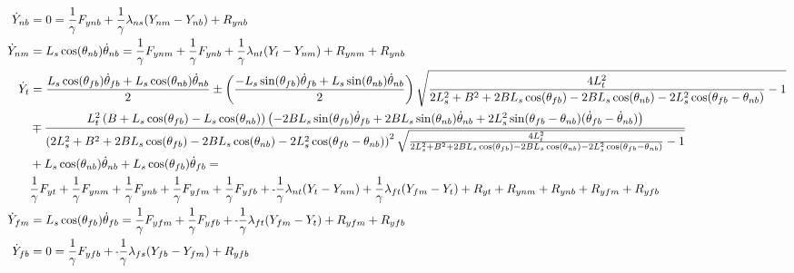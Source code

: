 \documentclass[11pt, landscape]{article}
\newcommand{\mn}{\scalebox{0.7}[1.0]{-}}
\begin{document}
\begin{align}
  \dot{Y}_{nb} &= 0 = \frac{1}{\gamma}F_{ynb} + \frac{1}{\gamma}\lambda_{ns}(Y_{nm} - Y_{nb}) + R_{ynb} \\
  \dot{Y}_{nm} &= L_s\cos(\theta_{nb})\dot{\theta}_{nb} = \frac{1}{\gamma}F_{ynm} + \frac{1}{\gamma}F_{ynb} + \frac{1}{\gamma}\lambda_{nt}(Y_{t } - Y_{nm}) + R_{ynm} + R_{ynb}\\
  \dot{Y}_{t}  &= \frac{L_s\cos(\theta_{fb})\dot{\theta}_{fb} + L_s\cos(\theta_{nb})\dot{\theta}_{nb}}{2} \pm \left(\frac{-L_s\sin(\theta_{fb})\dot{\theta}_{fb} + L_s\sin(\theta_{nb})\dot{\theta}_{nb}}{2}\right)\sqrt{\frac{4L_t^2}{2L_s^2 + B^2 + 2BL_s\cos(\theta_{fb}) -2BL_s\cos(\theta_{nb}) - 2L_s^2\cos(\theta_{fb} - \theta_{nb})} - 1}\\
  &\mp \frac{L_t^2\left(B + L_s\cos(\theta_{fb}) - L_s\cos(\theta_{nb})\right)\left(-2BL_s\sin(\theta_{fb})\dot{\theta}_{fb} + 2BL_s\sin(\theta_{nb})\dot{\theta}_{nb} + 2L_s^2\sin(\theta_{fb} - \theta_{nb})(\dot{\theta}_{fb} - \dot{\theta}_{nb})\right)}{\left(2L_s^2 + B^2 + 2BL_s\cos(\theta_{fb}) -2BL_s\cos(\theta_{nb}) - 2L_s^2\cos(\theta_{fb} - \theta_{nb})\right)^2\sqrt{\frac{4L_t^2}{2L_s^2 + B^2 + 2BL_s\cos(\theta_{fb}) -2BL_s\cos(\theta_{nb}) - 2L_s^2\cos(\theta_{fb} - \theta_{nb})} - 1}}\\ &+ L_s\cos(\theta_{nb})\dot{\theta}_{nb} + L_s\cos(\theta_{fb})\dot{\theta}_{fb} =\\ & \frac{1}{\gamma}F_{yt } + \frac{1}{\gamma}F_{ynm} + \frac{1}{\gamma}F_{ynb} + \frac{1}{\gamma}F_{yfm} + \frac{1}{\gamma}F_{yfb} + \mn\frac{1}{\gamma}\lambda_{nt}(Y_{t } - Y_{nm}) + \frac{1}{\gamma}\lambda_{ft}(Y_{fm} - Y_{t }) + R_{yt } + R_{ynm} + R_{ynb} + R_{yfm} + R_{yfb}\\
  \dot{Y}_{fm} &= L_s\cos(\theta_{fb})\dot{\theta}_{fb} = \frac{1}{\gamma}F_{yfm} + \frac{1}{\gamma}F_{yfb} + \mn\frac{1}{\gamma}\lambda_{ft}(Y_{fm} - Y_{t }) + R_{yfm} + R_{yfb}\\
  \dot{Y}_{fb} &= 0 = \frac{1}{\gamma}F_{yfb} + \mn\frac{1}{\gamma}\lambda_{fs}(Y_{fb} - Y_{fm}) + R_{yfb}
\end{align}
\end{document}
